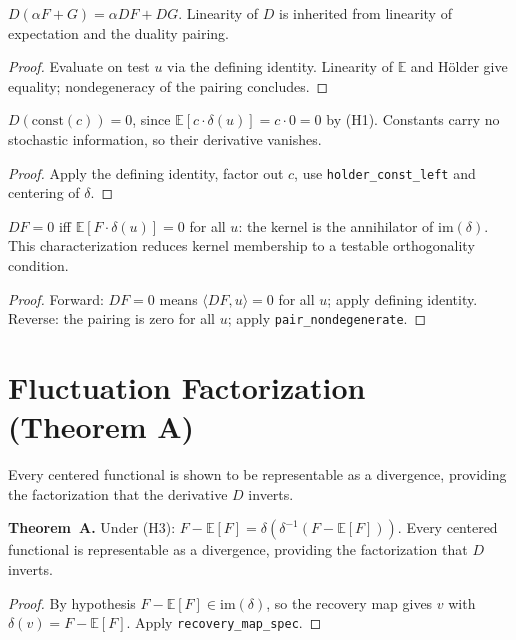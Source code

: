 \begin{theorem}[$D$ linear]\label{thm:D_linear}
\leanok
{}
$D(\alpha F + G) = \alpha DF + DG$.
Linearity of $D$ is inherited from linearity of expectation and the duality pairing.
\end{theorem}
\begin{proof}\leanok Evaluate on test $u$ via the defining identity. Linearity of $\mathbb{E}$ and Hölder give equality; nondegeneracy of the pairing concludes.\end{proof}

\begin{theorem}[$D$ on constants]\label{thm:D_const}
\leanok
{}
$D(\mathrm{const}(c)) = 0$, since $\mathbb{E}[c \cdot \delta(u)] = c \cdot 0 = 0$ by (H1).
Constants carry no stochastic information, so their derivative vanishes.
\end{theorem}
\begin{proof}\leanok Apply the defining identity, factor out $c$, use \texttt{holder\_const\_left} and centering of $\delta$.\end{proof}

\begin{theorem}\label{thm:ker_D}
\leanok
{}
$DF = 0$ iff $\mathbb{E}[F \cdot \delta(u)] = 0$ for all $u$: the kernel is the
annihilator of $\mathrm{im}(\delta)$.
This characterization reduces kernel membership to a testable orthogonality condition.
\end{theorem}
\begin{proof}\leanok Forward: $DF = 0$ means $\langle DF, u \rangle = 0$ for all $u$; apply defining identity. Reverse: the pairing is zero for all $u$; apply \texttt{pair\_nondegenerate}.\end{proof}

\section{Fluctuation Factorization (Theorem A)}

Every centered functional is shown to be representable as a divergence, providing the factorization that the derivative $D$ inverts.

\begin{theorem}\label{thm:factorization}
\leanok
{}
\textbf{Theorem~A.} Under (H3): $F - \mathbb{E}[F] = \delta(\delta^{-1}(F - \mathbb{E}[F]))$.
Every centered functional is representable as a divergence, providing the factorization that $D$ inverts.
\end{theorem}
\begin{proof}\leanok By hypothesis $F - \mathbb{E}[F] \in \mathrm{im}(\delta)$, so the recovery map gives $v$ with $\delta(v) = F - \mathbb{E}[F]$. Apply \texttt{recovery\_map\_spec}.\end{proof}

